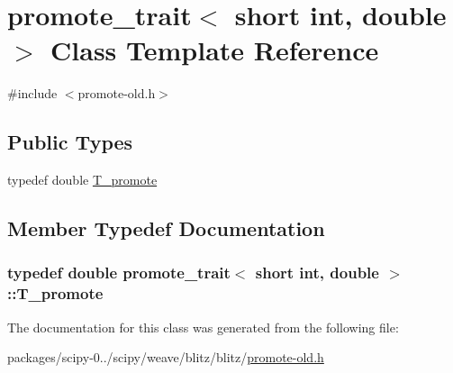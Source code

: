 \hypertarget{classpromote__trait_3_01short_01int_00_01double_01_4}{}\section{promote\+\_\+trait$<$ short int, double $>$ Class Template Reference}
\label{classpromote__trait_3_01short_01int_00_01double_01_4}


{\ttfamily \#include $<$promote-\/old.\+h$>$}

\subsection*{Public Types}
\begin{DoxyCompactItemize}
\item 
typedef double \hyperlink{classpromote__trait_3_01short_01int_00_01double_01_4_aefb4cfd56e94ed7bf467cff01f008bd6}{T\+\_\+promote}
\end{DoxyCompactItemize}


\subsection{Member Typedef Documentation}
\hypertarget{classpromote__trait_3_01short_01int_00_01double_01_4_aefb4cfd56e94ed7bf467cff01f008bd6}{}
\subsubsection[{T\+\_\+promote}]{\setlength{\rightskip}{0pt plus 5cm}typedef double {\bf promote\+\_\+trait}$<$ short int, double $>$\+::{\bf T\+\_\+promote}}\label{classpromote__trait_3_01short_01int_00_01double_01_4_aefb4cfd56e94ed7bf467cff01f008bd6}


The documentation for this class was generated from the following file\+:\begin{DoxyCompactItemize}
\item 
packages/scipy-\/0../scipy/weave/blitz/blitz/\hyperlink{promote-old_8h}{promote-\/old.\+h}\end{DoxyCompactItemize}
